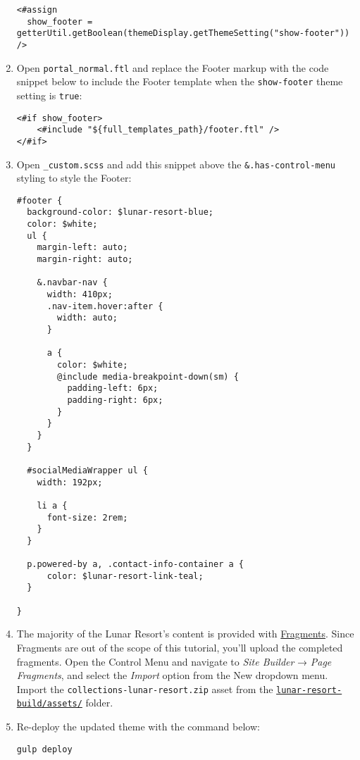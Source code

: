 \begin{enumerate}
\begin{verbatim}
<#assign
  show_footer = getterUtil.getBoolean(themeDisplay.getThemeSetting("show-footer"))
/>
\end{verbatim}
\item
  Open \texttt{portal\_normal.ftl} and replace the Footer markup with
  the code snippet below to include the Footer template when the
  \texttt{show-footer} theme setting is \texttt{true}:

\begin{verbatim}
<#if show_footer>
    <#include "${full_templates_path}/footer.ftl" />
</#if>
\end{verbatim}
\item
  Open \texttt{\_custom.scss} and add this snippet above the
  \texttt{\&.has-control-menu} styling to style the Footer:

\begin{verbatim}
#footer {
  background-color: $lunar-resort-blue;
  color: $white;
  ul {
    margin-left: auto;
    margin-right: auto;

    &.navbar-nav {
      width: 410px;
      .nav-item.hover:after {
        width: auto;
      }

      a {
        color: $white;
        @include media-breakpoint-down(sm) {
          padding-left: 6px;
          padding-right: 6px;
        }
      }
    }
  }

  #socialMediaWrapper ul {
    width: 192px;

    li a {
      font-size: 2rem;
    }
  }

  p.powered-by a, .contact-info-container a {
      color: $lunar-resort-link-teal;
  }

}
\end{verbatim}
\item
  The majority of the Lunar Resort's content is provided with
  \href{/docs/7-2/frameworks/-/knowledge_base/f/page-fragments}{Fragments}.
  Since Fragments are out of the scope of this tutorial, you'll upload
  the completed fragments. Open the Control Menu and navigate to
  \emph{Site Builder} → \emph{Page Fragments}, and select the
  \emph{Import} option from the New dropdown menu. Import the
  \texttt{collections-lunar-resort.zip} asset from the
  \href{https://github.com/liferay/liferay-docs/tree/master/en/developer/tutorials/code/lunar-resort-theme/lunar-resort-build/assets}{\texttt{lunar-resort-build/assets/}}
  folder.
\item
  Re-deploy the updated theme with the command below:

\begin{verbatim}
gulp deploy
\end{verbatim}
\end{enumerate}

